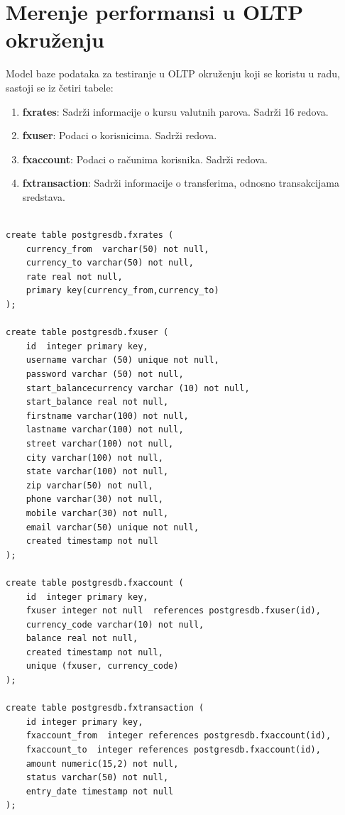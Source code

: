 \documentclass[12pt,oneside]{memoir}
\begin{document}
\section{Merenje performansi u OLTP okruženju}

Model baze podataka za testiranje u OLTP okruženju koji se koristu u radu, sastoji se iz četiri tabele:


\begin{enumerate}
\item[\textbullet] \textbf{fxrates}: {
	Sadrži informacije o kursu valutnih parova. Sadrži 16 redova.
}
\item[\textbullet] \textbf{fxuser}:{
	Podaci o korisnicima. Sadrži   redova.
}
\item[\textbullet] \textbf{fxaccount}:{
	Podaci o računima korisnika. Sadrži   redova.
}
\item[\textbullet] \textbf{fxtransaction}:{
	Sadrži informacije o transferima, odnosno transakcijama sredstava.
}
\end{enumerate}



\begin{lstlisting}[title={setup-postgres-model.sql},captionpos=t]

create table postgresdb.fxrates (
	currency_from  varchar(50) not null,
	currency_to varchar(50) not null,
	rate real not null,
	primary key(currency_from,currency_to)
);

create table postgresdb.fxuser (
	id  integer primary key,
	username varchar (50) unique not null,
	password varchar (50) not null,
	start_balancecurrency varchar (10) not null,
	start_balance real not null,
	firstname varchar(100) not null,
	lastname varchar(100) not null,
	street varchar(100) not null,
	city varchar(100) not null,
	state varchar(100) not null,
	zip varchar(50) not null,
	phone varchar(30) not null,
	mobile varchar(30) not null,
	email varchar(50) unique not null,
	created timestamp not null
);

create table postgresdb.fxaccount (
	id  integer primary key,
	fxuser integer not null  references postgresdb.fxuser(id),
	currency_code varchar(10) not null,
	balance real not null,
	created timestamp not null,
	unique (fxuser, currency_code)
);

create table postgresdb.fxtransaction (
	id integer primary key,
	fxaccount_from  integer references postgresdb.fxaccount(id),
	fxaccount_to  integer references postgresdb.fxaccount(id),
	amount numeric(15,2) not null,
	status varchar(50) not null,
	entry_date timestamp not null
);

\end{lstlisting}
\end{document}

